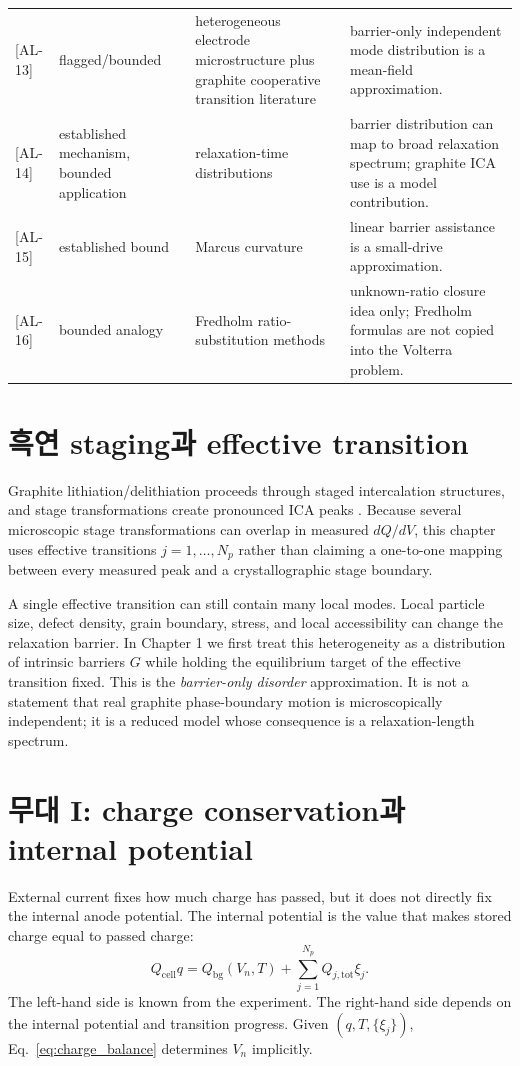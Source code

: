 \documentclass[11pt,a4paper]{article}
\newcommand{\bg}{\mathrm{bg}}
\newcommand{\cell}{\mathrm{cell}}
\newcommand{\tot}{\mathrm{tot}}
\newcommand{\AL}[1]{\textsf{[AL-#1]}}
\begin{document}
\begin{longtable}{p{} p{} p{} p{}}
\AL{13} & flagged/bounded & heterogeneous electrode microstructure plus graphite cooperative transition literature & barrier-only independent mode distribution is a mean-field approximation. \\
\AL{14} & established mechanism, bounded application & relaxation-time distributions \cite{svare2000,johnston2006,lindsey1980} & barrier distribution can map to broad relaxation spectrum; graphite ICA use is a model contribution. \\
\AL{15} & established bound & Marcus curvature \cite{marcus1956} & linear barrier assistance is a small-drive approximation. \\
\AL{16} & bounded analogy & Fredholm ratio-substitution methods \cite{lee2011,son2013,jcp2017} & unknown-ratio closure idea only; Fredholm formulas are not copied into the Volterra problem. \\
\bottomrule
\end{longtable}

\section{흑연 staging과 effective transition}\label{sec:staging}
Graphite lithiation/delithiation proceeds through staged intercalation structures, and stage transformations create pronounced ICA peaks
\cite{dahn1991,ohzuku1993,funabiki1999ea,funabiki1999jes}. Because several microscopic stage transformations can overlap in measured
$dQ/dV$, this chapter uses effective transitions $j=1,\dots,N_p$ rather than claiming a one-to-one mapping between every measured peak and
a crystallographic stage boundary.

A single effective transition can still contain many local modes. Local particle size, defect density, grain boundary, stress, and local
accessibility can change the relaxation barrier. In Chapter 1 we first treat this heterogeneity as a distribution of intrinsic barriers $G$ while
holding the equilibrium target of the effective transition fixed. This is the \emph{barrier-only disorder} approximation. It is not a statement
that real graphite phase-boundary motion is microscopically independent; it is a reduced model whose consequence is a relaxation-length
spectrum.

\section{무대 I: charge conservation과 internal potential}\label{sec:charge}
External current fixes how much charge has passed, but it does not directly fix the internal anode potential. The internal potential is the
value that makes stored charge equal to passed charge:
\begin{equation}
\boxed{\;Q_{\cell}q=Q_{\bg}(V_n,T)+\sum_{j=1}^{N_p}Q_{j,\tot}\xi_j.\;}
\label{eq:charge_balance}
\end{equation}
The left-hand side is known from the experiment. The right-hand side depends on the internal potential and transition progress. Given
$(q,T,\{\xi_j\})$, Eq.~\eqref{eq:charge_balance} determines $V_n$ implicitly.
\end{document}
